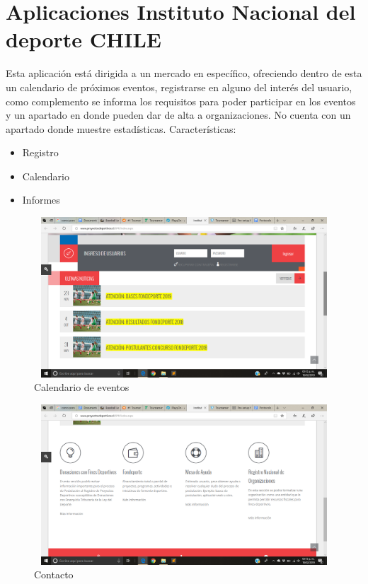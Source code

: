 \section{Aplicaciones Instituto Nacional del deporte CHILE}
\noindent Esta aplicación está dirigida a un mercado en específico, ofreciendo dentro de esta un calendario de próximos eventos, registrarse en alguno del interés del usuario, como complemento se informa los requisitos para poder participar en los eventos y  un apartado en donde pueden dar de alta a organizaciones. No cuenta con un apartado donde muestre estadísticas. \cite{IND}
Características: 
\begin{itemize}
	\item Registro
	\item Calendario
	\item Informes
	
\end{itemize}
\begin{figure}[hbt!]
	\centering
	\includegraphics[width=12cm, height=6cm]{Imagenes/Aplicaciones/INDC1.png}
	\caption{Calendario de eventos}
\end{figure}
\begin{figure}[hbt!]
	\centering
	\includegraphics[width=12cm, height=6cm]{Imagenes/Aplicaciones/INDC2.png}
	\caption{Contacto}
\end{figure}
\pagebreak

